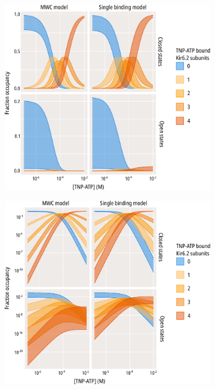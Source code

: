 \begin{figure}[hbtp]
	\centering
	\begin{subfigure}[t]{0.45\textwidth}
		\caption{}\label{ch4fig:w311_states_weights_1}
		\centering
		\includegraphics[width=\textwidth]{weighted_states.pdf}
	\end{subfigure}
	\hfill
	\begin{subfigure}[t]{0.45\textwidth}
		\caption{}\label{ch4fig:w311_states_weights_2}
		\centering
		\includegraphics[width=\textwidth]{weighted_states_2.pdf}

\end{subfigure}
\end{figure}
